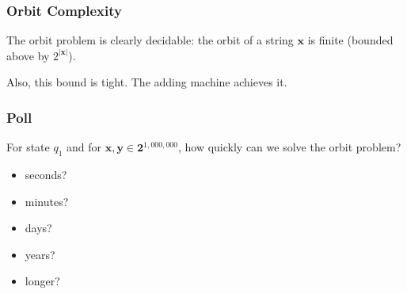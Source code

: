 \documentclass{beamer}
\newcommand{\ch}[1]{\mathbf{#1}}
\newcommand{\bin}{\pmb{\bm{2}}}
\begin{document}
\begin{frame}
    \frametitle{Orbit Complexity}
    The orbit problem is clearly decidable: the orbit of a string
    $\ch{x}$ is finite (bounded above by $2^{|\ch{x}|}$).
    \pause

    \vspace{.3cm}
    Also, this bound is tight. The adding machine achieves it.
    \begin{center}
    \end{center}
\end{frame}

\begin{frame}
    \frametitle{Poll}
    \begin{center}
        \scalebox{.8}{\usebox{\ccc}}
    \end{center}
    For state $q_1$ and for $\ch{x},\ch{y} \in \bin^{1,000,000}$, how quickly
    can we solve the orbit problem?
    \begin{itemize}
        \item seconds?
        \item minutes?
        \item days?
        \item years?
        \item longer?
    \end{itemize}
\end{frame}
\end{document}
